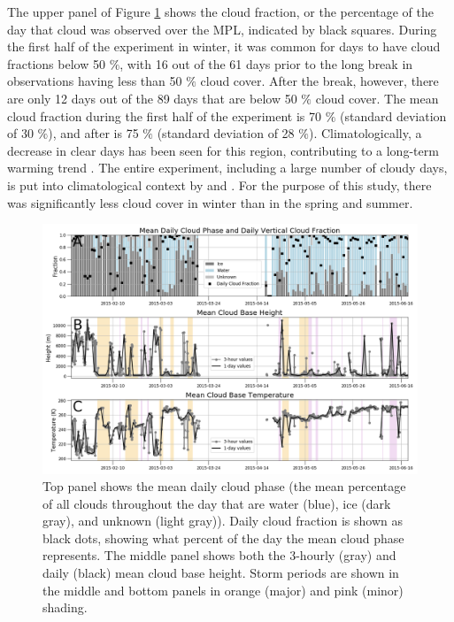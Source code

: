 The upper panel of Figure \ref{fig:cloudmacro} shows the cloud fraction, or the percentage of the day that cloud was observed over the MPL, indicated by black squares. During the first half of the experiment in winter, it was common for days to have cloud fractions below 50 $\%$, with 16 out of the 61 days prior to the long break in observations having less than 50 $\%$ cloud cover. After the break, however, there are only 12 days out of the 89 days that are below 50 $\%$ cloud cover. The mean cloud fraction during the first half of the experiment is 70 $\%$ (standard deviation of 30 $\%$), and after is 75 $\%$ (standard deviation of 28 $\%$). Climatologically, a decrease in clear days has been seen for this region, contributing to a long-term warming trend \citep{kayser:2017}. The entire experiment, including a large number of cloudy days, is put into climatological context by \citet{graham:2017} and \citet{kayser:2017}. For the purpose of this study, there was significantly less cloud cover in winter than in the spring and summer.

\begin{figure}[H]
    \centering
    \includegraphics[width=1\linewidth]{figures/chapter4/ch2_f4.png}
    \caption[Cloud fraction/phase, height, and temperature.]{Top panel shows the mean daily cloud phase (the mean percentage of all clouds throughout the day that are water (blue), ice (dark gray), and unknown (light gray)). Daily cloud fraction is shown as black dots, showing what percent of the day the mean cloud phase represents. The middle panel shows both the 3-hourly (gray) and daily (black) mean cloud base height. Storm periods are shown in the middle and bottom panels in orange (major) and pink (minor) shading.}
    \label{fig:cloudmacro}
\end{figure}



